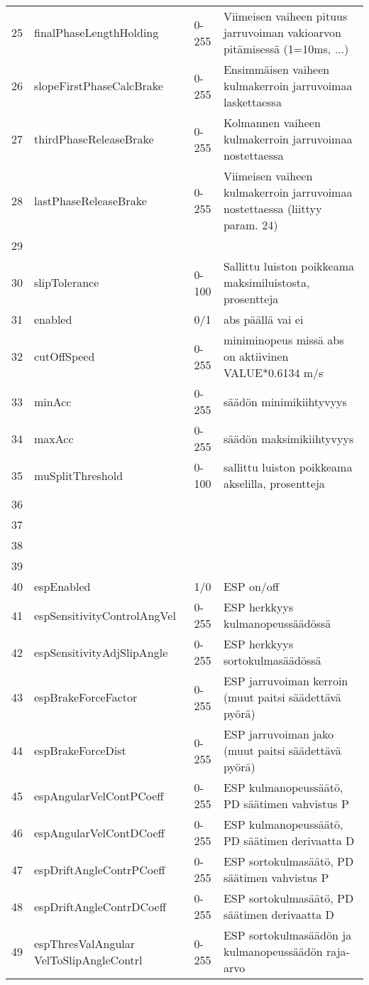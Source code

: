 \begin{longtable}{l | p{5cm} | l | p{5cm} }
25 & finalPhaseLengthHolding & 0-255 & Viimeisen vaiheen pituus jarruvoiman vakioarvon pitämisessä (1=10ms, ...)\\
26 & slopeFirstPhaseCalcBrake & 0-255 & Ensimmäisen vaiheen kulmakerroin jarruvoimaa laskettaessa\\
27 & thirdPhaseReleaseBrake & 0-255 & Kolmannen vaiheen kulmakerroin jarruvoimaa nostettaessa\\
28 & lastPhaseReleaseBrake & 0-255 & Viimeisen vaiheen kulmakerroin jarruvoimaa nostettaessa (liittyy param. 24)\\
29 &  &  & \\
30 & slipTolerance & 0-100 & Sallittu luiston poikkeama maksimiluistosta, prosentteja\\
31 & enabled & 0/1 & abs päällä vai ei\\
32 & cutOffSpeed & 0-255 & miniminopeus missä abs on aktiivinen VALUE*0.6134 m/s\\
33 & minAcc & 0-255 & säädön minimikiihtyvyys\\
34 & maxAcc & 0-255 & säädön maksimikiihtyvyys\\
35 & muSplitThreshold & 0-100 & sallittu luiston poikkeama akselilla, prosentteja\\
36 &  &  & \\
37 &  &  & \\
38 &  &  & \\
39 &  &  & \\
40 & espEnabled & 1/0 & ESP on/off\\
41 & espSensitivityControlAngVel & 0-255 & ESP herkkyys kulmanopeussäädössä\\
42 & espSensitivityAdjSlipAngle & 0-255 & ESP herkkyys sortokulmasäädössä\\
43 & espBrakeForceFactor & 0-255 & ESP jarruvoiman kerroin (muut paitsi säädettävä pyörä)\\
44 & espBrakeForceDist & 0-255 & ESP jarruvoiman jako (muut paitsi säädettävä pyörä)\\
45 & espAngularVelContPCoeff & 0-255 & ESP kulmanopeussäätö, PD säätimen vahvistus P\\
46 & espAngularVelContDCoeff & 0-255 & ESP kulmanopeussäätö, PD säätimen derivaatta D\\
47 & espDriftAngleContrPCoeff & 0-255 & ESP sortokulmasäätö, PD säätimen vahvistus P\\
48 & espDriftAngleContrDCoeff & 0-255 & ESP sortokulmasäätö, PD säätimen derivaatta D\\
49 & espThresValAngular VelToSlipAngleContrl & 0-255 & ESP sortokulmasäädön ja kulmanopeussäädön raja-arvo\\

\end{longtable}
